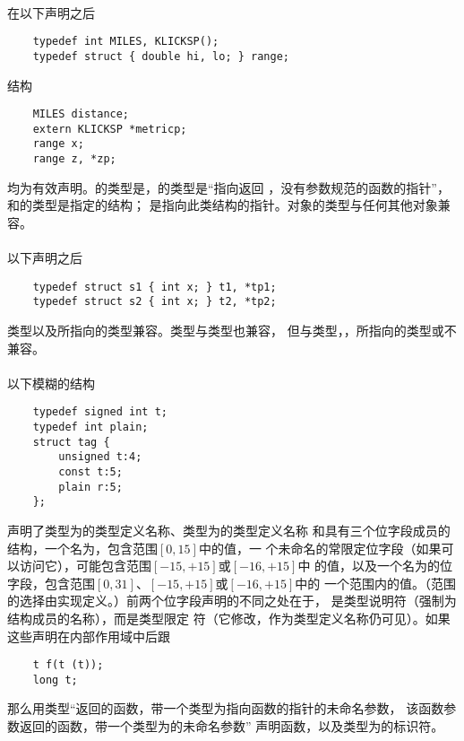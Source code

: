 {\paragraph{}
\ex 在以下声明之后
\begin{lstlisting}
    typedef int MILES, KLICKSP();
    typedef struct { double hi, lo; } range;
\end{lstlisting}
结构
\begin{lstlisting}
    MILES distance;
    extern KLICKSP *metricp;
    range x;
    range z, *zp;
\end{lstlisting}
均为有效声明。的类型是，的类型是``指向返回
，没有参数规范的函数的指针''，和的类型是指定的结构；
是指向此类结构的指针。对象的类型与任何其他对象兼容。

\paragraph{}
\ex 以下声明之后
\begin{lstlisting}
    typedef struct s1 { int x; } t1, *tp1;
    typedef struct s2 { int x; } t2, *tp2;
\end{lstlisting}
类型以及所指向的类型兼容。类型与类型也兼容，
但与类型，，所指向的类型或不兼容。

\paragraph{}
\ex 以下模糊的结构
\begin{lstlisting}
    typedef signed int t;
    typedef int plain;
    struct tag {
        unsigned t:4;
        const t:5;
        plain r:5;
    };
\end{lstlisting}
声明了类型为的类型定义名称、类型为的类型定义名称
和具有三个位字段成员的结构，一个名为，包含范围$[0,15]$中的值，一
个未命名的常限定位字段（如果可以访问它），可能包含范围$[-15,+15]$或$[-16,+15]$中
的值，以及一个名为的位字段，包含范围$[0,31]$、$[-15,+15]$或$[-16,+15]$中的
一个范围内的值。（范围的选择由实现定义。）前两个位字段声明的不同之处在于，
是类型说明符（强制为结构成员的名称），而是类型限定
符（它修改，作为类型定义名称仍可见）。如果这些声明在内部作用域中后跟
\begin{lstlisting}
    t f(t (t));
    long t;
\end{lstlisting}
那么用类型``返回的函数，带一个类型为指向函数的指针的未命名参数，
该函数参数返回的函数，带一个类型为的未命名参数''
声明函数，以及类型为的标识符。

}
